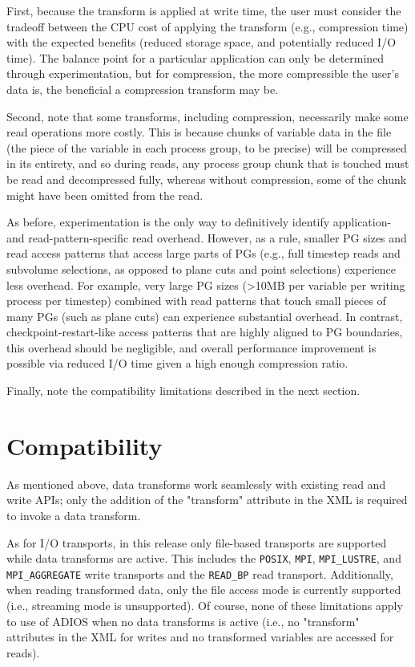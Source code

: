 First, because the transform is applied at write time, the user must consider the tradeoff between the CPU cost of applying
the transform (e.g., compression time) with the expected benefits (reduced storage space, and potentially reduced I/O time).
The balance point for a particular application can only be determined through experimentation, but for compression,
the more compressible the user's data is, the beneficial a compression transform may be.

Second, note that some transforms, including compression, necessarily make some read operations more costly. This is because
chunks of variable data in the file (the piece of the variable in each process group, to be precise) will be compressed
in its entirety, and so during reads, any process group chunk that is touched must be read and decompressed fully, whereas
without compression, some of the chunk might have been omitted from the read.

As before, experimentation is the only way to definitively identify application- and read-pattern-specific read overhead.
However, as a rule, smaller PG sizes and read access
patterns that access large parts of PGs (e.g., full timestep reads and subvolume selections, as opposed to plane cuts and
point selections) experience less overhead. For example, very large PG sizes (>10MB per variable per writing process per timestep)
combined with read patterns that touch small pieces of many PGs (such as plane cuts) can experience substantial overhead.
In contrast, checkpoint-restart-like access patterns that are highly aligned to PG boundaries,
this overhead should be negligible, and overall performance improvement is possible via reduced I/O time given a high enough compression
ratio.

Finally, note the compatibility limitations described in the next section.

\section{Compatibility}
As mentioned above, data transforms work seamlessly with existing read and write APIs; only the addition of the "transform" attribute
in the XML is required to invoke a data transform.

As for I/O transports, in this release only file-based transports are supported while data transforms are active.
This includes the \verb+POSIX+, \verb+MPI+, \verb+MPI_LUSTRE+, and \verb+MPI_AGGREGATE+ write transports and
the \verb+READ_BP+ read transport. Additionally,
when reading transformed data, only the file access mode is currently supported (i.e., streaming mode is unsupported).
Of course, none of these limitations apply to use of ADIOS when no data transforms is active
(i.e., no "transform" attributes in the XML for writes and no transformed variables are accessed for reads).

